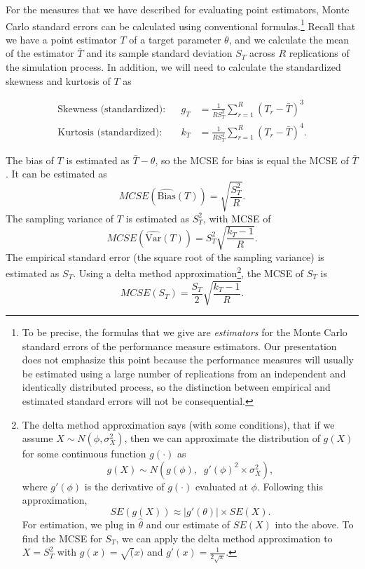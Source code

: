 \documentclass[
]{book}
\newcommand{\Var}{\text{Var}}
\newcommand{\Bias}{\text{Bias}}
\begin{document}
For the measures that we have described for evaluating point estimators, Monte Carlo standard errors can be calculated using conventional formulas.\footnote{To be precise, the formulas that we give are \emph{estimators} for the Monte Carlo standard errors of the performance measure estimators. Our presentation does not emphasize this point because the performance measures will usually be estimated using a large number of replications from an independent and identically distributed process, so the distinction between empirical and estimated standard errors will not be consequential.}
Recall that we have a point estimator \(T\) of a target parameter \(\theta\), and we calculate the mean of the estimator \(\bar{T}\) and its sample standard deviation \(S_T\) across \(R\) replications of the simulation process.
In addition, we will need to calculate the standardized skewness and kurtosis of \(T\) as

\[
\begin{aligned}
\text{Skewness (standardized):} &  &g_T &= \frac{1}{R S_T^3}\sum_{r=1}^R \left(T_r - \bar{T}\right)^3 \\
\text{Kurtosis (standardized):} &  &k_T &= \frac{1}{R S_T^4} \sum_{r=1}^R \left(T_r - \bar{T}\right)^4.
\end{aligned}
\label{eq:skewness-kurtosis}
\]

The bias of \(T\) is estimated as \(\bar{T} - \theta\), so the MCSE for bias is equal the MCSE of \(\bar{T}\). It can be estimated as
\[
MCSE\left(\widehat{\Bias}(T)\right) = \sqrt{\frac{S_T^2}{R}}.
\label{eq:MCSE-bias}
\]
The sampling variance of \(T\) is estimated as \(S_T^2\), with MCSE of
\[
MCSE\left(\widehat{\Var}(T)\right) = S_T^2 \sqrt{\frac{k_T - 1}{R}}.
\label{eq:MCSE-var}
\]
The empirical standard error (the square root of the sampling variance) is estimated as \(S_T\). Using a delta method approximation\footnote{The delta method approximation says (with some conditions), that if we assume \(X \sim N\left( \phi, \sigma_X^2 \right)\), then we can approximate the distribution of \(g(X)\) for some continuous function \(g(\cdot)\) as
  \[ g(X) \sim N\left( g(\phi), \;\; g'(\phi)^2 \times \sigma_X^2 \right),\]
  where \(g'(\phi)\) is the derivative of \(g(\cdot)\) evaluated at \(\phi\).
  Following this approximation,
  \[ SE( g(X) ) \approx \left| g'(\theta) \right|  \times SE(X) .\]
  For estimation, we plug in \(\hat{\theta}\) and our estimate of \(SE(X)\) into the above.
  To find the MCSE for \(S_T\), we can apply the delta method approximation to \(X = S_T^2\) with \(g(x) = \sqrt(x)\) and \(g'(x) =\frac{1}{2\sqrt{x}}\).}, the MCSE of \(S_T\) is
\[
MCSE\left(S_T\right) = \frac{S_T}{2}\sqrt{\frac{k_T - 1}{R}}.
\label{eq:MCSE-SE}
\]
\end{document}
